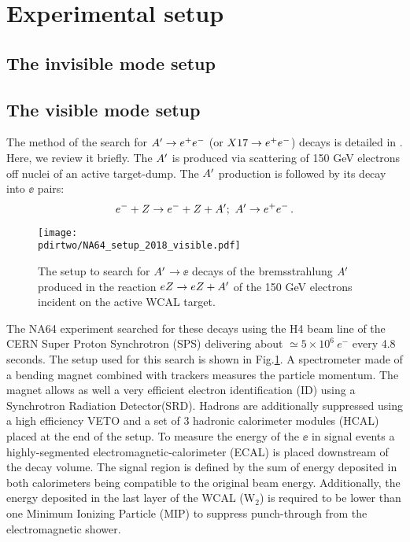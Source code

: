 \section{Experimental setup}
\label{chapter2:sec:experimental-setup}

\subsection{The invisible mode setup}
\label{chapter2:sec:invismode}

\subsection{The visible mode setup}
\label{chapter2:sec:vismode}

The method of the search for $A' \to e^+e^-$ (or $X17 \rightarrow e^+ e^-$) decays is detailed in \cite{Gninenko:2013rka, Andreas:2013lya, gkkk1, DMsimulation}. Here, we review it briefly. The $A'$ is produced via scattering of 150 GeV electrons off nuclei of an active target-dump. The $A'$ production is followed by its decay into $\ee$ pairs:
\begin{equation}
e^- + Z \to e^- + Z + A'   ;~ A'\to e^+e^- \,.
\label{ea}
\end{equation}


\begin{figure}[tb]
\centering
\texttt{[image: \\pdirtwo/NA64\_setup\_2018\_visible.pdf]}
\caption[NA64 visible mode setup 2018]{The setup to search for $A'$$\to \ee$  decays of the bremsstrahlung $A'$ produced in the reaction
$eZ \to eZ+A' $ of the 150 GeV electrons incident on the active WCAL target.}
\label{fig:setup-2018}
\end{figure}

The NA64 experiment searched for these decays using the H4 beam line of the CERN Super Proton Synchrotron (SPS) delivering about  $\simeq 5\times 10^6~e^-$ every 4.8 seconds. The setup used for this search is shown in Fig.\ref{fig:setup-2018}. A spectrometer made of a bending magnet combined with trackers measures the particle momentum. The magnet allows as well a very efficient electron identification (ID) using a Synchrotron Radiation Detector(SRD). Hadrons are additionally suppressed using a high efficiency VETO and a set of 3 hadronic calorimeter modules (HCAL) placed at the end of the setup. To measure the energy of the $\ee$ in signal events a highly-segmented electromagnetic-calorimeter (ECAL) is placed downstream of the decay volume. The signal region is defined by the sum of energy deposited in both calorimeters being compatible to the original beam energy. Additionally, the energy deposited in the last layer of the WCAL (W$_2$) is required to be lower than one Minimum Ionizing Particle (MIP) to suppress punch-through from the electromagnetic shower.

